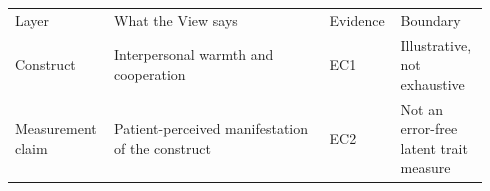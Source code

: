 \begin{tabular}{p{0.20\linewidth}p{0.44\linewidth}p{0.12\linewidth}p{0.18\linewidth}}
Layer & What the View says & Evidence & Boundary \\
Construct & Interpersonal warmth and cooperation & EC1 & Illustrative, not exhaustive \\
Measurement claim & Patient-perceived manifestation of the construct & EC2 & Not an error-free latent trait measure \\
\end{tabular}
